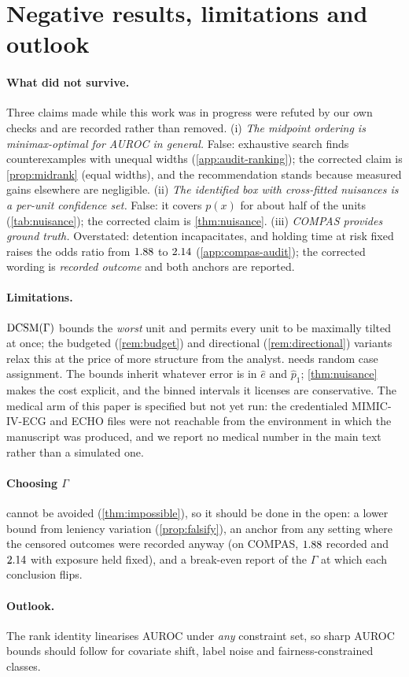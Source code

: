 \section{Negative results, limitations and outlook}
\label{sec:discussion}

\paragraph{What did not survive.} Three claims made while this work was in
progress were refuted by our own checks and are recorded rather than removed.
(i) \emph{The midpoint ordering is minimax-optimal for AUROC in general.}
False: exhaustive search finds counterexamples with unequal widths
(\cref{app:audit-ranking}); the corrected claim is \cref{prop:midrank}
(equal widths), and the recommendation stands because measured gains
elsewhere are negligible. (ii) \emph{The identified box with cross-fitted
nuisances is a per-unit confidence set.} False: it covers $p(x)$ for about
half of the units (\cref{tab:nuisance}); the corrected claim is
\cref{thm:nuisance}. (iii) \emph{COMPAS provides ground truth.} Overstated:
detention incapacitates, and holding time at risk fixed raises the odds ratio
from $1.88$ to $2.14$
(\cref{app:compas-audit}); the corrected wording is \emph{recorded outcome}
and both anchors are reported.

\paragraph{Limitations.} $\textup{DCSM}(\Gamma)$ bounds the \emph{worst} unit and
permits every unit to be maximally tilted at once; the budgeted
(\cref{rem:budget}) and directional (\cref{rem:directional}) variants relax
this at the price of more structure from the analyst. 
needs random case assignment. The bounds inherit whatever error is in
$\hat e$ and $\hat p_1$; \cref{thm:nuisance} makes the cost explicit, and the
binned intervals it licenses are conservative. The medical arm of this paper is specified but not
yet run: the credentialed MIMIC-IV-ECG and ECHO files were not reachable from
the environment in which the manuscript was produced, and we report no medical
number in the main text rather than a simulated one.

\paragraph{Choosing $\Gamma$} cannot be avoided (\cref{thm:impossible}), so
it should be done in the open: a lower bound from leniency variation
(\cref{prop:falsify}), an anchor from any setting where the censored outcomes
were recorded anyway (on COMPAS, $1.88$ recorded and
$2.14$ with exposure held fixed), and a break-even report of
the $\Gamma$ at which each conclusion flips.

\paragraph{Outlook.} The rank identity linearises AUROC under \emph{any}
constraint set, so sharp AUROC bounds should follow for covariate shift, label
noise and fairness-constrained classes.\label{lastmainpage}
